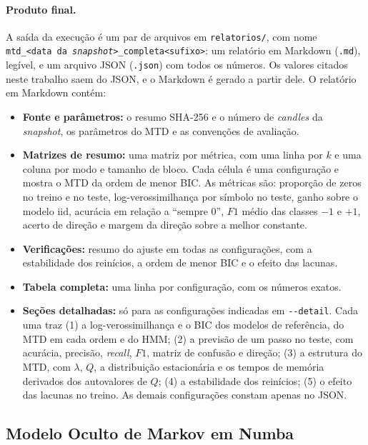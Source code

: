 \documentclass[
    12pt,                %
    openright,           %
    oneside,             %
    a4paper,             %
    english,             %
    brazil               %
]{abntex2}
\begin{document}
\paragraph{Produto final.} A saída da execução é um par de arquivos em \texttt{relatorios/}, com nome \texttt{mtd\_<data da \textit{snapshot}>\_completa<sufixo>}: um relatório em Markdown (\texttt{.md}),
legível, e um arquivo JSON (\texttt{.json}) com todos os números. Os valores citados neste trabalho saem do JSON, e o Markdown é gerado a partir dele. O relatório em Markdown contém:

\begin{itemize}
  \item \textbf{Fonte e parâmetros:} o resumo SHA-256 e o número de \textit{candles} da \textit{snapshot}, os parâmetros do MTD e as convenções de avaliação.
  \item \textbf{Matrizes de resumo:} uma matriz por métrica, com uma linha por $k$ e uma coluna por modo e tamanho de bloco. Cada célula é uma configuração e mostra o MTD da ordem de menor BIC.
  As métricas são: proporção de zeros no treino e no teste, log-verossimilhança por símbolo no teste, ganho sobre o modelo iid, acurácia em relação a ``sempre 0'', $F1$ médio das classes $-1$ e $+1$,
  acerto de direção e margem da direção sobre a melhor constante.
  \item \textbf{Verificações:} resumo do ajuste em todas as configurações, com a estabilidade dos reinícios, a ordem de menor BIC e o efeito das lacunas.
  \item \textbf{Tabela completa:} uma linha por configuração, com os números exatos.
  \item \textbf{Seções detalhadas:} só para as configurações indicadas em \texttt{-{}-detail}. Cada uma traz (1) a log-verossimilhança e o BIC dos modelos de referência, do MTD em cada ordem e do HMM;
  (2) a previsão de um passo no teste, com acurácia, precisão, \textit{recall}, $F1$, matriz de confusão e direção; (3) a estrutura do MTD, com $\lambda$, $Q$, a distribuição estacionária e os tempos de memória
  derivados dos autovalores de $Q$; (4) a estabilidade dos reinícios; (5) o efeito das lacunas no treino. As demais configurações constam apenas no JSON.
\end{itemize}

\subsection{Modelo Oculto de Markov em Numba}
\label{sec:hmm_numba}
\end{document}
